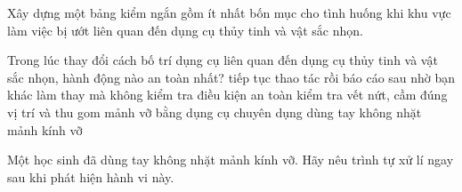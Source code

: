 \begin{bt}
Xây dựng một bảng kiểm ngắn gồm ít nhất bốn mục cho tình huống khi khu vực làm việc bị ướt liên quan đến dụng cụ thủy tinh và vật sắc nhọn.
\end{bt}

\begin{ex}
Trong lúc thay đổi cách bố trí dụng cụ liên quan đến dụng cụ thủy tinh và vật sắc nhọn, hành động nào an toàn nhất?
\choice
{tiếp tục thao tác rồi báo cáo sau}
{nhờ bạn khác làm thay mà không kiểm tra điều kiện an toàn}
{\True kiểm tra vết nứt, cầm đúng vị trí và thu gom mảnh vỡ bằng dụng cụ chuyên dụng}
{dùng tay không nhặt mảnh kính vỡ}
\end{ex}

\begin{bt}
Một học sinh đã dùng tay không nhặt mảnh kính vỡ. Hãy nêu trình tự xử lí ngay sau khi phát hiện hành vi này.
\end{bt}

